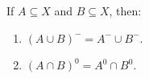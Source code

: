If $A \subseteq X$ and $B \subseteq X$, then:
\begin{enumerate}
\item $(A \cup B)^- = A^- \cup B^-$.
\item $(A \cap B)^0 = A^0 \cap B^0$.
\end{enumerate}

